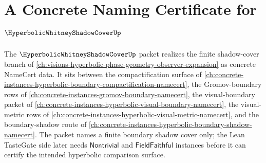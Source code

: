 \chapter{A Concrete Naming Certificate for $\HyperbolicWhitneyShadowCoverUp$}
\label{ch:concrete-instances-hyperbolic-whitney-shadow-cover-namecert}

The $\HyperbolicWhitneyShadowCoverUp$ packet realizes the finite shadow-cover branch of \autoref{ch:visions-hyperbolic-phase-geometry-observer-expansion} as concrete NameCert data. It sits between the compactification surface of \autoref{ch:concrete-instances-hyperbolic-boundary-compactification-namecert}, the Gromov-boundary rows of \autoref{ch:concrete-instances-gromov-boundary-namecert}, the visual-boundary packet of \autoref{ch:concrete-instances-hyperbolic-visual-boundary-namecert}, the visual-metric rows of \autoref{ch:concrete-instances-hyperbolic-visual-metric-namecert}, and the boundary-shadow route of \autoref{ch:concrete-instances-hyperbolic-boundary-shadow-namecert}. The packet names a finite boundary shadow cover only; the Lean TasteGate side later needs $\mathsf{Nontrivial}$ and $\mathsf{FieldFaithful}$ instances before it can certify the intended hyperbolic comparison surface.

